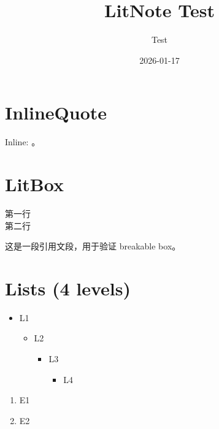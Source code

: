 \documentclass[lists=true,litbox=true,colorscheme=CN]{Hypo-LitNote}
\title{LitNote Test}
\author{Test}
\date{2026-01-17}
\begin{document}
\maketitle
\tableofcontents

\section{InlineQuote}
Inline: 。

\section{LitBox}
\begin{poem}[title={Poem Title}]
第一行\\
第二行
\end{poem}

\begin{quotepara}[title={Quote Title}]
这是一段引用文段，用于验证 breakable box。
\end{quotepara}

\section{Lists (4 levels)}
\begin{itemize}
  \item L1
  \begin{itemize}
    \item L2
    \begin{itemize}
      \item L3
      \begin{itemize}
        \item L4
      \end{itemize}
    \end{itemize}
  \end{itemize}
\end{itemize}

\begin{enumerate}
  \item E1
  \item E2
\end{enumerate}
\end{document}
